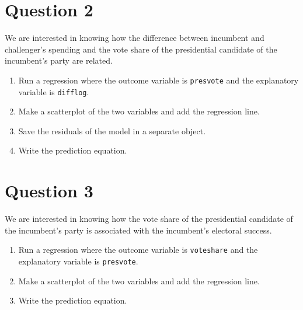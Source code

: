 \documentclass[12pt,letterpaper]{article}
\begin{document}
\newpage

\section*{Question 2}
\noindent We are interested in knowing how the difference between incumbent and challenger's spending and the vote share of the presidential candidate of the incumbent's party are related.	\vspace{.25cm}
	\begin{enumerate}
		\item Run a regression where the outcome variable is \texttt{presvote} and the explanatory variable is \texttt{difflog}.	\vspace{5cm}
		\item Make a scatterplot of the two variables and add the regression line. 	\vspace{5cm}
		\item Save the residuals of the model in a separate object.	\vspace{5cm}
		\item Write the prediction equation.
	\end{enumerate}
	
	\newpage	
\section*{Question 3}

\noindent We are interested in knowing how the vote share of the presidential candidate of the incumbent's party is associated with the incumbent's electoral success.
	\vspace{.25cm}
	\begin{enumerate}
		\item Run a regression where the outcome variable is \texttt{voteshare} and the explanatory variable is \texttt{presvote}.
			\vspace{5cm}
		\item Make a scatterplot of the two variables and add the regression line. 
			\vspace{5cm}
		\item Write the prediction equation.
	\end{enumerate}
	

\newpage	
\end{document}
